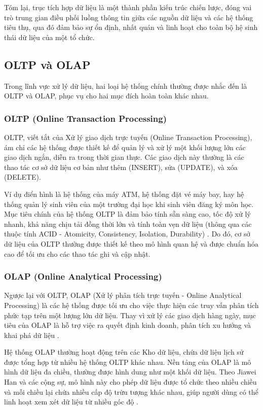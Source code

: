 Tóm lại, trục tích hợp dữ liệu là một thành phần kiến trúc chiến lược, đóng vai trò trung gian điều phối luồng thông tin giữa các nguồn dữ liệu và các hệ thống tiêu thụ, qua đó đảm bảo sự ổn định, nhất quán và linh hoạt cho toàn bộ hệ sinh thái dữ liệu của một tổ chức.

\subsection{OLTP và OLAP}
Trong lĩnh vực xử lý dữ liệu, hai loại hệ thống chính thường được nhắc đến là OLTP và OLAP, phục vụ cho hai mục đích hoàn toàn khác nhau.

\subsubsection{OLTP (Online Transaction Processing)}
OLTP, viết tắt của Xử lý giao dịch trực tuyến (Online Transaction Processing), ám chỉ các hệ thống được thiết kế để quản lý và xử lý một khối lượng lớn các giao dịch ngắn, diễn ra trong thời gian thực. Các giao dịch này thường là các thao tác cơ sở dữ liệu cơ bản như thêm (INSERT), sửa (UPDATE), và xóa (DELETE).

Ví dụ điển hình là hệ thống của máy ATM, hệ thống đặt vé máy bay, hay hệ thống quản lý sinh viên của một trường đại học khi sinh viên đăng ký môn học. Mục tiêu chính của hệ thống OLTP là đảm bảo tính sẵn sàng cao, tốc độ xử lý nhanh, khả năng chịu tải đồng thời lớn và tính toàn vẹn dữ liệu (thông qua các thuộc tính ACID - Atomicity, Consistency, Isolation, Durability) \cite{microsoft:oltp}. Do đó, cơ sở dữ liệu của OLTP thường được thiết kế theo mô hình quan hệ và được chuẩn hóa cao để tối ưu cho các thao tác ghi và cập nhật.

\subsubsection{OLAP (Online Analytical Processing)}
Ngược lại với OLTP, OLAP (Xử lý phân tích trực tuyến - Online Analytical Processing) là các hệ thống được tối ưu cho việc thực hiện các truy vấn phân tích phức tạp trên một lượng lớn dữ liệu. Thay vì xử lý các giao dịch hàng ngày, mục tiêu của OLAP là hỗ trợ việc ra quyết định kinh doanh, phân tích xu hướng và khai phá dữ liệu \cite{pareek2007business}.

Hệ thống OLAP thường hoạt động trên các Kho dữ liệu, chứa dữ liệu lịch sử được tổng hợp từ nhiều hệ thống OLTP khác nhau. Nền tảng của OLAP là mô hình dữ liệu đa chiều, thường được hình dung như một khối dữ liệu. Theo Jiawei Han và các cộng sự, mô hình này cho phép dữ liệu được tổ chức theo nhiều chiều và mỗi chiều lại chứa nhiều cấp độ trừu tượng khác nhau, giúp người dùng có thể linh hoạt xem xét dữ liệu từ nhiều góc độ \cite{han2011datamining}.

